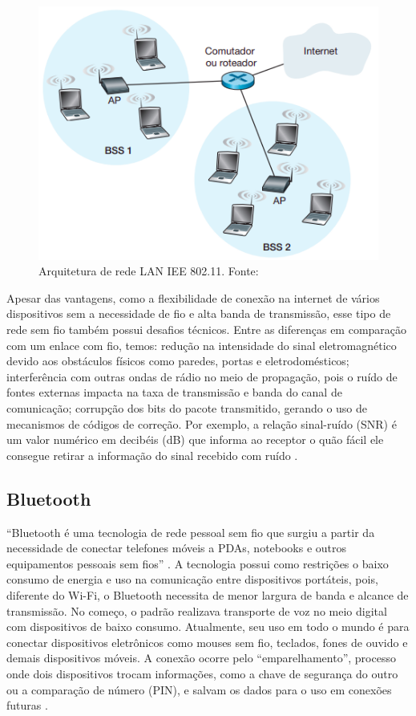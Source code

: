 \begin{figure}[ht]
    \centering
    \includegraphics[width=.42\textwidth]{img/wifi-design.png}
    \caption{Arquitetura de rede LAN IEE 802.11. Fonte: \cite{redeskurose2010}}\label{figWifi}
\end{figure}

Apesar das vantagens, como a flexibilidade de conexão na internet de vários dispositivos sem a necessidade 
de fio e alta banda de transmissão, esse tipo de rede sem fio também possui desafios técnicos. Entre as diferenças 
em comparação com um enlace com fio, temos: redução na intensidade do sinal eletromagnético devido aos obstáculos físicos 
como paredes, portas e eletrodomésticos; interferência com outras ondas de rádio no meio de propagação, pois o ruído de fontes
externas impacta na taxa de transmissão e banda do canal de comunicação; corrupção dos bits do pacote transmitido, gerando 
o uso de mecanismos de códigos de correção. Por exemplo, a relação sinal-ruído (SNR) é um valor numérico em decibéis (dB) que informa 
ao receptor o quão fácil ele consegue retirar a informação do sinal recebido com ruído \cite[pp. 408]{redeskurose2010}.

\subsection{Bluetooth}

``Bluetooth é uma tecnologia de rede pessoal sem fio que surgiu a partir da necessidade de
conectar telefones móveis a PDAs, notebooks e outros equipamentos pessoais sem fios'' \cite[pp. 138]{sistemas-distribuidos-coulouris2013}. A tecnologia
possui como restrições o baixo consumo de energia e uso na comunicação entre dispositivos portáteis, pois, diferente do Wi-Fi, o Bluetooth 
necessita de menor largura de banda e alcance de transmissão. No começo, o padrão realizava transporte de voz no meio digital com dispositivos de baixo consumo. Atualmente, seu uso em todo o mundo é para conectar 
dispositivos eletrônicos como mouses sem fio, teclados, fones de ouvido e demais dispositivos móveis. A conexão ocorre pelo ``emparelhamento'', processo onde dois dispositivos 
trocam informações, como a chave de segurança do outro ou a comparação de número (PIN), e salvam os dados para o uso em conexões futuras \cite{blueetoothIntel}. 

